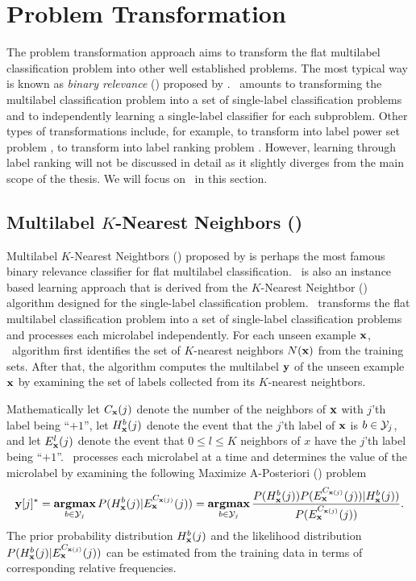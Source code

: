 {%
%
\section{Problem Transformation}

The problem transformation approach aims to transform the flat multilabel classification problem into other well established problems.
The most typical way is known as \textit{binary relevance} (\br) proposed by \citet{Tsoumakas07multi,Tsoumakas10mining}.
\br\ amounts to transforming the multilabel classification problem into a set of single-label classification problems and to independently learning a single-label classifier for each subproblem.
Other types of transformations include, for example, to transform into label power set problem \citep{Tsoumakas07random}, to transform into label ranking problem \citep{Elisseeff01akernel,Brinker07case,Furnkranz08multilabel,Chiang12a}.
However, learning through label ranking will not be discussed in detail as it slightly diverges from the main scope of the thesis.
We will focus on \br\ in this section.



%
%
\subsection{Multilabel $K$-Nearest Neighbors (\mlknn)} \label{sc_mlknn}

Multilabel $K$-Nearest Neightbors (\mlknn) proposed by \citet{Zhang05a,Zhang07mlknn} is perhaps the most famous binary relevance classifier for flat multilabel classification.
\mlknn\ is also an instance based learning approach \citep{Aha91instance} that is derived from the $K$-Nearest Neightbor (\knn) algorithm designed for the single-label classification problem.
\mlknn\ transforms the flat multilabel classification problem into a set of single-label classification problems and processes each microlabel independently.
For each unseen example $\mathbf {x}$, \mlknn\ algorithm first identifies the set of $K$-nearest neighbors $N(\mathbf {x})$ from the training sets.
After that, the algorithm computes the multilabel $\mathbf {y}$ of the unseen example $\mathbf {x}$ by examining the set of labels collected from its $K$-nearest neightbors.

Mathematically 
let $C_{\mathbf {x}}(j)$ denote the number of the neighbors of $\mathbf {x}$ with $j$'th label being ``$+1$'',
let $H^b_{\mathbf {x}}(j)$ denote the event that the $j$'th label of $\mathbf {x}$ is $b\in\mathcal{Y}_j$,
and let $E_{\mathbf {x}}^l(j)$ denote the event that $0\le l \le K$ neighbors of $x$ have the $j$'th label being ``$+1$''.
\mlknn\ processes each microlabel at a time and determines the value of the microlabel by examining the following Maximize A-Posteriori (\map) problem
\begin{align*}
	\mathbf {y}[j]^* = \underset{b\in\mathcal{Y}_j}{\textbf{argmax}} \, P( H^b_{\mathbf {x}}(j) | E_{\mathbf {x}}^{C_{\mathbf {x}(j)}}(j) )
	= \underset{b\in\mathcal{Y}_j}{\textbf{argmax}} \, \frac{P( H^b_{\mathbf {x}}(j) ) P(  E_{\mathbf {x}}^{C_{\mathbf {x}(j)}}(j) ) | H^b_{\mathbf {x}}(j))}{P( E_{\mathbf {x}}^{C_{\mathbf {x}(j)}}(j))}.
\end{align*}
The prior probability distribution $H^b_{\mathbf {x}}(j)$ and the likelihood distribution $P( H^b_{\mathbf {x}}(j) | E_{\mathbf {x}}^{C_{\mathbf {x}(j)}}(j) )$ can be estimated from the training data in terms of corresponding relative frequencies.

}
